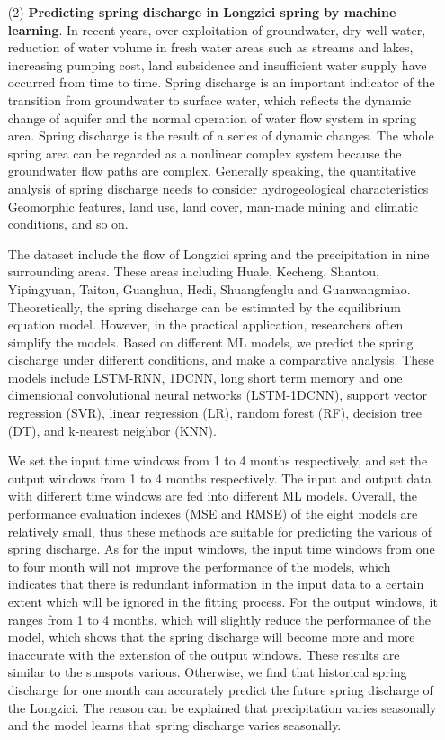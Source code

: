 \begin{enumerate}
  \item[(2)] \textbf{Predicting spring discharge in Longzici spring by machine learning}. In recent years, over exploitation of groundwater, dry well water, reduction of water volume in fresh water areas such as streams and lakes, increasing pumping cost, land subsidence and insufficient water supply have occurred from time to time. Spring discharge is an important indicator of the transition from groundwater to surface water, which reflects the dynamic change of aquifer and the normal operation of water flow system in spring area. Spring discharge is the result of a series of dynamic changes. The whole spring area can be regarded as a nonlinear complex system because the groundwater flow paths are complex. Generally speaking, the quantitative analysis of spring discharge needs to consider hydrogeological characteristics Geomorphic features, land use, land cover, man-made mining and climatic conditions, and so on.
  
  The dataset include the flow of Longzici spring and the precipitation in nine surrounding areas. These areas including Huale, Kecheng, Shantou, Yipingyuan, Taitou, Guanghua, Hedi, Shuangfenglu and Guanwangmiao. Theoretically, the spring discharge can be estimated by the equilibrium equation model. However, in the practical application, researchers often simplify the models. Based on different ML models, we predict the spring discharge under different conditions, and make a comparative analysis. These models include LSTM-RNN, 1DCNN, long short term memory and one dimensional convolutional neural networks (LSTM-1DCNN), support vector regression (SVR), linear regression (LR), random forest (RF), decision tree (DT), and k-nearest neighbor (KNN).

  We set the input time windows from 1 to 4 months respectively, and set the output windows from 1 to 4 months respectively. The input and output data with different time windows are fed into different ML models. Overall, the performance evaluation indexes (MSE and RMSE) of the eight models are relatively small, thus these methods are suitable for predicting the various of spring discharge. As for the input windows, the input time windows from one to four month will not improve the performance of the models, which indicates that there is redundant information in the input data to a certain extent which will be ignored in the fitting process. For the output windows, it ranges from 1 to 4 months, which will slightly reduce the performance of the model, which shows that the spring discharge will become more and more inaccurate with the extension of the output windows. These results are similar to the sunspots various. Otherwise, we find that historical spring discharge for one month can accurately predict the future spring discharge of the Longzici. The reason can be explained that precipitation varies seasonally and the model learns that spring discharge varies seasonally.
  

\end{enumerate}
